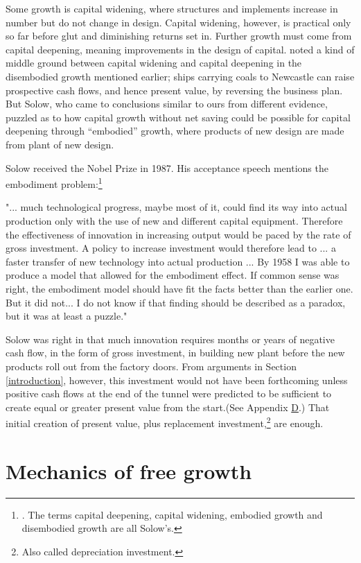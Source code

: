 \documentclass[a4padisinvitingper,fleqn]{latex_styles/cas-sc}
\begin{document}
Some growth is capital widening, where structures and implements
increase in number but do not change in design. Capital widening,
however, is practical only so far before glut and diminishing returns
set in. Further growth must come from capital deepening,
meaning improvements in the design of capital.
\citet{solowContributionTheoryEconomic1956a} noted a kind of middle
ground between capital widening and capital deepening in the disembodied
growth mentioned earlier; ships carrying coals to Newcastle can raise
prospective cash flows, and hence present value, by reversing the
business plan. But Solow, who came to conclusions similar to ours from
different evidence, puzzled as to how capital growth without net
saving could be possible for capital deepening through ``embodied''
growth, where products of new design are made from plant of new
design.

Solow received the Nobel Prize in 1987. His acceptance speech mentions the embodiment problem:\footnote{\cite{solow1988}. The terms capital deepening, capital widening, embodied growth and disembodied growth are all Solow's.}

"... much technological progress, maybe most of it, could find its way into actual production only with the use of new and different capital equipment. Therefore the effectiveness of innovation in increasing output would be paced by the rate of gross investment. A policy to increase investment would therefore lead to ... a faster transfer of new technology into actual production ... By 1958 I was able to produce a model that allowed for the embodiment effect. If common sense was right, the embodiment model should have fit the facts better than the earlier one. But it did not... I do not know if that finding should be described as a paradox, but it was at least a puzzle."

Solow was right in that much innovation requires months or years of negative cash flow, in the form of gross investment, in building new plant before the new products roll out from the factory doors. From arguments in Section \ref{introduction}, however, this investment would not have been forthcoming unless positive cash flows at the end of the tunnel were predicted to be sufficient to create equal or greater present value from the start.(See Appendix \hyperref[appendix-d]{D}.) That initial creation of present value, plus replacement investment,\footnote{Also called depreciation investment.} are enough.

\hypertarget{mechanics-of-free-growth}{%
\section{Mechanics of free growth}\label{mechanics-of-free-growth}}
\end{document}
